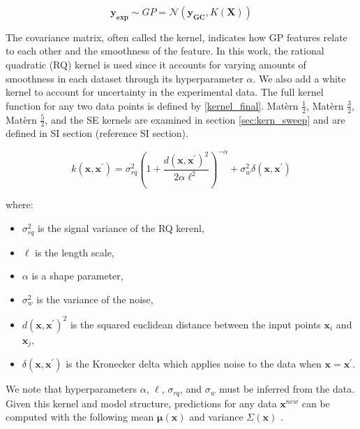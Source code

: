 \documentclass[journal=jacsat,manuscript=article]{achemso}
\begin{document}
\begin{equation}
    \mathbf{y_{\text{exp}}} \sim GP = \mathcal{N}\left( \mathbf{y_{GC}}, K(\mathbf{X}) \right)
    \label{Method_final}
\end{equation}

The covariance matrix, often called the kernel, indicates how GP features relate to each other and the smoothness of the feature. In this work, the rational quadratic (RQ) kernel is used since it accounts for varying amounts of smoothness in each dataset through its hyperparameter $\alpha$. We also add a white kernel to account for uncertainty in the experimental data. The full kernel function for any two data points is defined by \eqref{kernel_final}. Mat\`ern $\frac{1}{2}$, Mat\`ern $\frac{3}{2}$, Mat\`ern $\frac{5}{2}$, and the SE kernels are examined in section \ref{sec:kern_sweep} and are defined in SI section (reference SI section).

\begin{equation}
    k(\mathbf{x},\mathbf{x}^{\prime}) = \sigma_{rq}^2 \left(1 + \frac{d(\mathbf{x}, \mathbf{x}^{\prime})^2}{2\alpha \ell^2}\right)^{-\alpha} + \sigma_w^2\delta(\mathbf{x}, \mathbf{x}^{\prime})
    \label{kernel_final}
\end{equation}

\noindent where:
\begin{itemize}
  \item \( \sigma_{rq}^2 \) is the signal variance of the RQ kerenl,
  \item \( \ell \) is the length scale,
  \item \( \alpha \) is a shape parameter,
  \item \( \sigma_w^2 \) is the variance of the noise,
  \item \( d(\mathbf{x}, \mathbf{x}^{\prime})^2 \) is the squared euclidean distance between the input points \( \mathbf{x}_i \) and \( \mathbf{x}_j \),
  \item \( \delta(\mathbf{x}, \mathbf{x}^{\prime}) \) is the Kronecker delta which applies noise to the data when \( \mathbf{x} = \mathbf{x}^{\prime} \).
\end{itemize}

We note that hyperparameters $\alpha$, $\ell$, $\sigma_{rq}$, and $\sigma_{w}$ must be inferred from the data. Given this kernel and model structure, predictions for any data $\mathbf{x}^{new}$ can be computed with the following mean $\boldsymbol{\mu}(\mathbf{x})$ and variance $\Sigma(\mathbf{x})$ \cite{Gramacy2020Surrogates:Sciences}.
\end{document}
